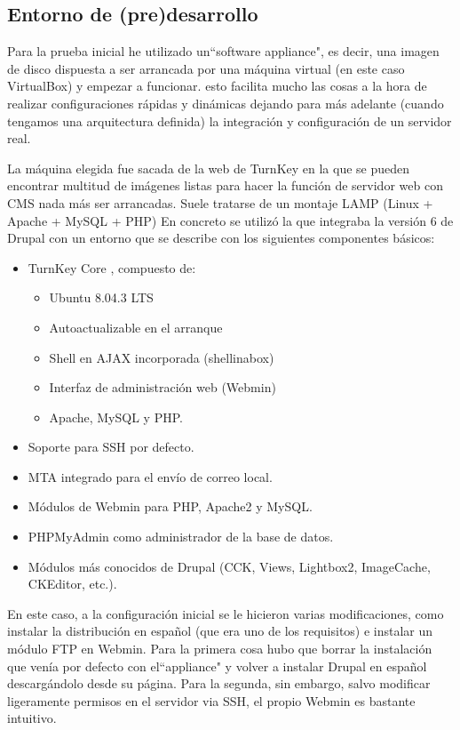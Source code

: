 \subsection{Entorno de (pre)desarrollo}
\par Para la prueba inicial he utilizado un``software appliance", es decir, una imagen de disco dispuesta a ser arrancada por una máquina virtual (en este caso VirtualBox) y empezar a funcionar. esto facilita mucho las cosas a la hora de realizar configuraciones rápidas y dinámicas dejando para más adelante (cuando tengamos una arquitectura definida) la integración y configuración de un servidor real.

La máquina elegida fue sacada de la web de TurnKey \cite{references:turnkey} en la que se pueden encontrar multitud de imágenes listas para hacer la función de servidor web con CMS nada más ser arrancadas. Suele tratarse de un montaje LAMP (Linux + Apache + MySQL + PHP) \cite{references:LAMP} En concreto se utilizó la que integraba la versión 6 de Drupal \cite{references:turnkeydrupal} con un entorno que se describe con los siguientes componentes básicos:

\begin{itemize}
\item TurnKey Core \cite{references:turnkeycore}, compuesto de:
	\begin{itemize}
	\item Ubuntu 8.04.3 LTS
	\item Autoactualizable en el arranque
	\item Shell en AJAX incorporada (shellinabox\cite{references:shellinabox})
	\item Interfaz de administración web (Webmin\cite{references:webmin})
	\item Apache, MySQL y PHP.
	\end{itemize}
\item Soporte para SSH por defecto.
\item MTA integrado para el envío de correo local.
\item Módulos de Webmin para PHP, Apache2 y MySQL.
\item PHPMyAdmin como administrador de la base de datos.
\item Módulos más conocidos de Drupal (CCK, Views, Lightbox2, ImageCache, CKEditor, etc.).
\end{itemize}

\par En este caso, a la configuración inicial se le hicieron varias modificaciones, como instalar la distribución en español (que era uno de los requisitos) e instalar un módulo FTP en Webmin. Para la primera cosa hubo que borrar la instalación que venía por defecto con el``appliance" y volver a instalar Drupal en español descargándolo desde su página\cite{references:drupalhispano}. Para la segunda, sin embargo, salvo modificar ligeramente permisos en el servidor via SSH, el propio Webmin es bastante intuitivo.

